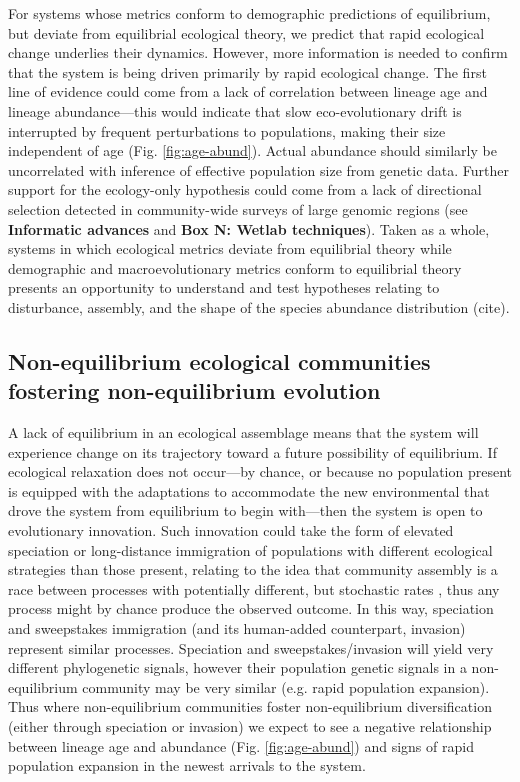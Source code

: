 \documentclass[12pt]{article}
\begin{document}
For systems whose metrics conform to demographic predictions of
equilibrium, but deviate from equilibrial ecological theory, we
predict that rapid ecological change underlies their
dynamics. However, more information is needed to confirm that the
system is being driven primarily by rapid ecological change. The first
line of evidence could come from a lack of correlation between lineage
age and lineage abundance---this would indicate that slow
eco-evolutionary drift is interrupted by frequent perturbations to
populations, making their size independent of age
(Fig. \ref{fig:age-abund}). Actual abundance should similarly be
uncorrelated with inference of effective population size from genetic
data. Further support for the ecology-only hypothesis could come from
a lack of directional selection detected in community-wide surveys of
large genomic regions (see \textbf{Informatic advances} and
\textbf{Box N: Wetlab techniques}). Taken as a whole, systems in which
ecological metrics deviate from equilibrial theory while demographic
and macroevolutionary metrics conform to equilibrial theory presents
an opportunity to understand and test hypotheses relating to
disturbance, assembly, and the shape of the species abundance
distribution (cite).

\subsection{Non-equilibrium ecological communities fostering non-equilibrium evolution}

A lack of equilibrium in an ecological assemblage means that the
system will experience change on its trajectory toward a future
possibility of equilibrium. If ecological relaxation does not
occur---by chance, or because no population present is equipped with
the adaptations to accommodate the new environmental that drove the
system from equilibrium to begin with---then the system is open to
evolutionary innovation.  Such innovation could take the form of
elevated speciation or long-distance immigration of populations with
different ecological strategies than those present, relating to the
idea that community assembly is a race between processes with
potentially different, but stochastic rates \cite{Vanoverbeke2015-ym},
thus any process might by chance produce the observed outcome. In this
way, speciation and sweepstakes immigration (and its human-added
counterpart, invasion) represent similar processes. Speciation and
sweepstakes/invasion will yield very different phylogenetic signals,
however their population genetic signals in a non-equilibrium
community may be very similar (e.g. rapid population expansion). Thus
where non-equilibrium communities foster non-equilibrium
diversification (either through speciation or invasion) we expect to
see a negative relationship between lineage age and abundance (Fig.
\ref{fig:age-abund}) and signs of rapid population expansion in the
newest arrivals to the system.
\end{document}
